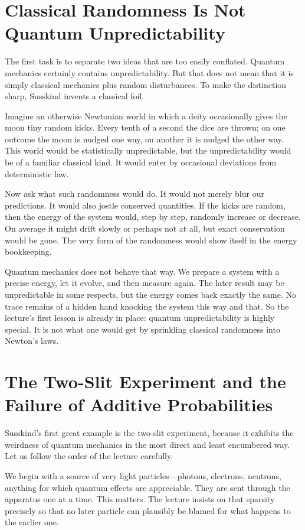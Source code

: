 \section{Classical Randomness Is Not Quantum Unpredictability}

The first task is to separate two ideas that are too easily conflated. Quantum mechanics certainly contains unpredictability. But that does not mean that it is simply classical mechanics plus random disturbances. To make the distinction sharp, Susskind invents a classical foil.

Imagine an otherwise Newtonian world in which a deity occasionally gives the moon tiny random kicks. Every tenth of a second the dice are thrown; on one outcome the moon is nudged one way, on another it is nudged the other way. This world would be statistically unpredictable, but the unpredictability would be of a familiar classical kind. It would enter by occasional deviations from deterministic law.

Now ask what such randomness would do. It would not merely blur our predictions. It would also jostle conserved quantities. If the kicks are random, then the energy of the system would, step by step, randomly increase or decrease. On average it might drift slowly or perhaps not at all, but exact conservation would be gone. The very form of the randomness would show itself in the energy bookkeeping.

Quantum mechanics does not behave that way. We prepare a system with a precise energy, let it evolve, and then measure again. The later result may be unpredictable in some respects, but the energy comes back exactly the same. No trace remains of a hidden hand knocking the system this way and that. So the lecture's first lesson is already in place: quantum unpredictability is highly special. It is not what one would get by sprinkling classical randomness into Newton's laws.

\section{The Two-Slit Experiment and the Failure of Additive Probabilities}

Susskind's first great example is the two-slit experiment, because it exhibits the weirdness of quantum mechanics in the most direct and least encumbered way. Let us follow the order of the lecture carefully.

We begin with a source of very light particles---photons, electrons, neutrons, anything for which quantum effects are appreciable. They are sent through the apparatus one at a time. This matters. The lecture insists on that sparsity precisely so that no later particle can plausibly be blamed for what happens to the earlier one.

